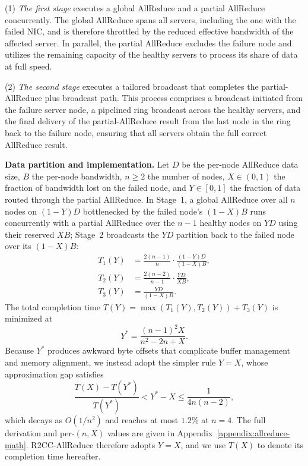 \documentclass[letterpaper,twocolumn,10pt]{article}
\begin{document}
(1) \textit{The first stage} executes a global AllReduce and a partial AllReduce concurrently. The global AllReduce spans all servers, including the one with the failed NIC, and is therefore throttled by the reduced effective bandwidth of the affected server. In parallel, the partial AllReduce excludes the failure node and utilizes the remaining capacity of the healthy servers to process its share of data at full speed.

(2) \textit{The second stage} executes a tailored broadcast that completes the partial-AllReduce plus broadcast path. This process comprises a broadcast initiated from the failure server node, a pipelined ring broadcast across the healthy servers, and the final delivery of the partial-AllReduce result from the last node in the ring back to the failure node, ensuring that all servers obtain the full correct AllReduce result.

\smallskip\noindent\textbf{Data partition and implementation.} Let $D$ be the per-node AllReduce data size, $B$ the per-node bandwidth, $n \geq 2$ the number of nodes, $X \in (0, 1)$ the fraction of bandwidth lost on the failed node, and $Y \in [0, 1]$ the fraction of data routed through the partial AllReduce. In Stage~1, a global AllReduce over all $n$ nodes on $(1-Y)D$ bottlenecked by the failed node's $(1-X)B$ runs concurrently with a partial AllReduce over the $n-1$ healthy nodes on $YD$ using their reserved $XB$; Stage~2 broadcasts the $YD$ partition back to the failed node over its $(1-X)B$:
\begin{align*}
T_1(Y) &= \frac{2(n-1)}{n} \cdot \frac{(1-Y)D}{(1-X)B}, \\
T_2(Y) &= \frac{2(n-2)}{n-1} \cdot \frac{YD}{XB}, \\
T_3(Y) &= \frac{YD}{(1-X)B}.
\end{align*}
The total completion time $T(Y) = \max(T_1(Y), T_2(Y)) + T_3(Y)$ is minimized at
$$Y^* = \frac{(n-1)^2 X}{n^2 - 2n + X}.$$
Because $Y^*$ produces awkward byte offsets that complicate buffer management and memory alignment, we instead adopt the simpler rule $Y = X$, whose approximation gap satisfies
$$\frac{T(X) - T(Y^*)}{T(Y^*)} < Y^* - X \leq \frac{1}{4n(n-2)},$$
which decays as $O(1/n^2)$ and reaches at most $1.2\%$ at $n = 4$. The full derivation and per-$(n, X)$ values are given in Appendix~\ref{appendix:allreduce-math}. R2CC-AllReduce therefore adopts $Y = X$, and we use $T(X)$ to denote its completion time hereafter.
\end{document}
